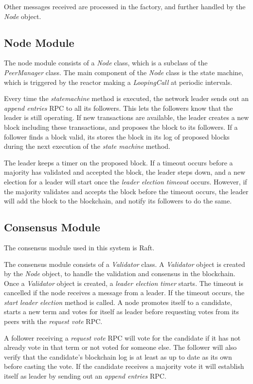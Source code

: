 Other messages received are processed in the factory, and further handled by the \textit{Node} object.


\subsection{Node Module}
The node module consists of a \textit{Node} class, which is a subclass of the \textit{PeerManager} class. The main component of the \textit{Node} class is the state machine, which is triggered by the reactor making a \textit{LoopingCall} at periodic intervals. 

Every time the \textit{state\textunderscore machine} method is executed, the network leader sends out an \textit{append entries} RPC to all its followers. This lets the followers know that the leader is still operating. If new transactions are available, the leader creates a new block including these transactions, and proposes the block to its followers. If a follower finds a block valid, its stores the block in its log of proposed blocks during the next execution of the \textit{state machine} method. 

The leader keeps a timer on the proposed block. If a timeout occurs before a majority has validated and accepted the block, the leader steps down, and a new election for a leader will start once the \textit{leader election timeout} occurs. However, if the majority validates and accepts the block before the timeout occurs, the leader will add the block to the blockchain, and notify its followers to do the same. 

\subsection{Consensus Module}
The consensus module used in this system is Raft. 

The consensus module consists of a \textit{Validator} class. A \textit{Validator} object is created by the \textit{Node} object, to handle the validation and consensus in the blockchain. Once a \textit{Validator} object is created, a \textit{leader election timer} starts. The timeout is cancelled if the node receives a message from a leader. If the timeout occurs, the \textit{start leader election} method is called. A node promotes itself to a candidate, starts a new term and votes for itself as leader before requesting votes from its peers with the \textit{request vote} RPC. 

A follower receiving a \textit{request vote} RPC will vote for the candidate if it has not already vote in that term or not voted for someone else. The follower will also verify that the candidate's blockchain log is at least as up to date as its own before casting the vote. If the candidate receives a majority vote it will establish itself as leader by sending out an \textit{append entries} RPC. 

